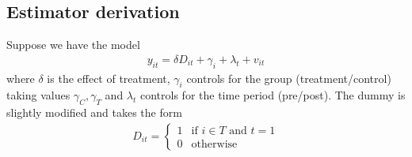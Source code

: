         \subsection{Estimator derivation}
            Suppose we have the model
			\begin{align}
				y_{it} = \delta D_{it} + \gamma_i + \lambda_t + v_{it}
			\end{align}
			where $\delta$ is the effect of treatment, $\gamma_i$ controls for the group (treatment/control) taking values $\gamma_C,\gamma_T$  and $\lambda_t$ controls for the time period (pre/post). The dummy is slightly modified and takes the form
			\begin{align}
				D_{it} =
				\begin{cases}
					1 & \text{if }i\in T\text{ and } t=1\\
					0 & \text{otherwise}
				\end{cases}
			\end{align}

